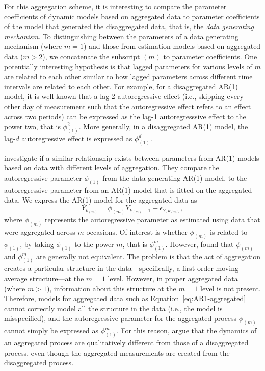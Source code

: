 \documentclass[man]{apa7} %
\begin{document}
For this aggregation scheme, it is interesting to compare the parameter coefficients of dynamic models based on aggregated data to parameter coefficients of the model that generated the disaggregated data, that is, the \textit{data generating mechanism}. To distinguishing between the parameters of a data generating mechanism (where $m = 1$) and those from estimation models based on aggregated data ($m > 2$), we concatenate the subscript ${(m)}$ to parameter coefficients. One potentially interesting hypothesis is that lagged parameters for various levels of $m$ are related to each other similar to how lagged parameters across different time intervals are related to each other. For example, for a disaggregated AR(1) model, it is well-known that a lag-2 autoregressive effect (i.e., skipping every other day of measurement such that the autoregressive effect refers to an effect across two periods) can be expressed as the lag-1 autoregresssive effect to the power two, that is $\phi_{(1)}^{2}$. More generally, in a disaggregated AR(1) model, the lag-$d$ autoregressive effect is expressed as $\phi_{(1)}^{d}$. 

\textcite{ironmonger_note_1959, nerlove_estimation_1959, telser_discrete_1967} investigate if a similar relationship exists between parameters from AR(1) models based on data with different levels of aggregation. They compare the autoregressive parameter $\phi_{(1)}$ from the data generating AR(1) model, to the autoregressive parameter from an AR(1) model that is fitted on the aggregated data. We express the AR(1) model for the aggregated data as
\begin{equation} \label{eq:AR1-aggregated}
    Y_{k_{(m)}} = \phi_{(m)} Y_{k_{(m)} - 1} + \epsilon_{Y,k_{(m)}},
\end{equation} 
where $\phi_{(m)}$ represents the autoregressive parameter as estimated using data that were aggregated across $m$ occasions. Of interest is whether $\phi_{(m)}$ is related to $\phi_{(1)}$, by taking $\phi_{(1)}$ to the power $m$, that is $\phi_{(1)}^{m}$. However, \textcite{ironmonger_note_1959, nerlove_estimation_1959, telser_discrete_1967} found that $\phi_{(m)}$ and $\phi_{(1)}^{m}$ are generally not equivalent. The problem is that the act of aggregation creates a particular structure in the data---specifically, a first-order moving average structure---at the $m = 1$ level. However, in proper aggregated data (where $m > 1$), information about this structure at the $m = 1$ level is not present. Therefore, models for aggregated data such as Equation~\ref{eq:AR1-aggregated} cannot correctly model all the structure in the data (i.e., the model is misspecified), and the autoregressive parameter for the aggregated process $\phi_{(m)}$ cannot simply be expressed as $\phi_{(1)}^{m}$. For this reason, \textcite{amemiya_effect_1972} argue that the dynamics of an aggregated process are qualitatively different from those of a disaggregated process, even though the aggregated measurements are created from the disaggregated process. 
\end{document}
